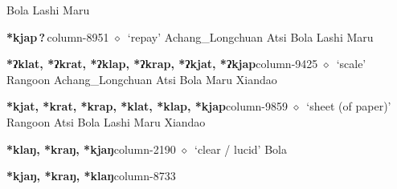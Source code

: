         Bola 
\hspace{1ex}
         Lashi 
\hspace{1ex}
         Maru 
  \item {\footnotesize \textbf{*kjap\,?\,}}{\tiny column-8951}
         $\diamond$~`repay'
         Achang\_Longchuan 
\hspace{1ex}
         Atsi 
\hspace{1ex}
         Bola 
\hspace{1ex}
         Lashi 
\hspace{1ex}
         Maru 
  \item {\footnotesize \textbf{*ʔklat, *ʔkrat, *ʔklap, *ʔkrap, *ʔkjat, *ʔkjap}}{\tiny column-9425}
         $\diamond$~`scale'
         Rangoon 
\hspace{1ex}
         Achang\_Longchuan 
\hspace{1ex}
         Atsi 
\hspace{1ex}
         Bola 
\hspace{1ex}
         Maru 
\hspace{1ex}
         Xiandao 
  \item {\footnotesize \textbf{*kjat, *krat, *krap, *klat, *klap, *kjap}}{\tiny column-9859}
         $\diamond$~`sheet (of paper)'
         Rangoon 
\hspace{1ex}
         Atsi 
\hspace{1ex}
         Bola 
\hspace{1ex}
         Lashi 
\hspace{1ex}
         Maru 
\hspace{1ex}
         Xiandao 
  \item {\footnotesize \textbf{*klaŋ, *kraŋ, *kjaŋ}}{\tiny column-2190}
         $\diamond$~`clear / lucid'
         Bola 
  \item {\footnotesize \textbf{*kjaŋ, *kraŋ, *klaŋ}}{\tiny column-8733}
